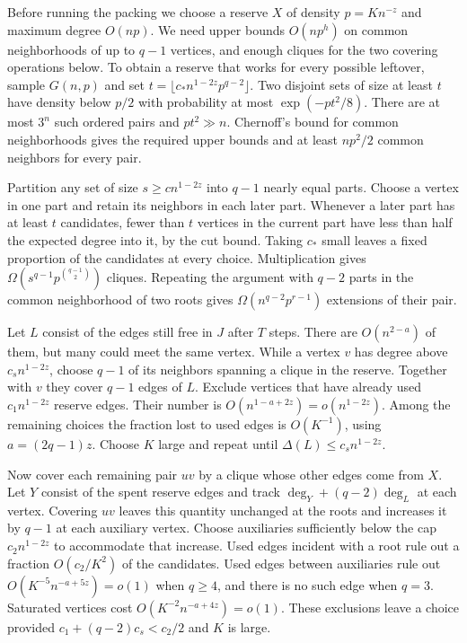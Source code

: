 \documentclass[english,11pt,a4paper]{article}
\begin{document}
Before running the packing we choose a reserve \(X\) of density \(p=Kn^{-z}\) and maximum degree \(O(np)\). We need upper bounds \(O(np^h)\) on common neighborhoods of up to \(q-1\) vertices, and enough cliques for the two covering operations below. To obtain a reserve that works for every possible leftover, sample \(G(n,p)\) and set \(t=\lfloor c_* n^{1-2z}p^{q-2}\rfloor\). Two disjoint sets of size at least \(t\) have density below \(p/2\) with probability at most \(\exp(-pt^2/8)\). There are at most \(3^n\) such ordered pairs and \(pt^2\gg n\). Chernoff's bound for common neighborhoods gives the required upper bounds and at least \(np^2/2\) common neighbors for every pair.

Partition any set of size \(s\ge c n^{1-2z}\) into \(q-1\) nearly equal parts. Choose a vertex in one part and retain its neighbors in each later part. Whenever a later part has at least \(t\) candidates, fewer than \(t\) vertices in the current part have less than half the expected degree into it, by the cut bound. Taking \(c_*\) small leaves a fixed proportion of the candidates at every choice. Multiplication gives \(\Omega(s^{q-1}p^{\binom{q-1}2})\) cliques. Repeating the argument with \(q-2\) parts in the common neighborhood of two roots gives \(\Omega(n^{q-2}p^{r-1})\) extensions of their pair.

Let \(L\) consist of the edges still free in \(J\) after \(T\) steps. There are \(O(n^{2-a})\) of them, but many could meet the same vertex. While a vertex \(v\) has degree above \(c_s n^{1-2z}\), choose \(q-1\) of its neighbors spanning a clique in the reserve. Together with \(v\) they cover \(q-1\) edges of \(L\). Exclude vertices that have already used \(c_1 n^{1-2z}\) reserve edges. Their number is \(O(n^{1-a+2z})=o(n^{1-2z})\). Among the remaining choices the fraction lost to used edges is \(O(K^{-1})\), using \(a=(2q-1)z\). Choose \(K\) large and repeat until \(\Delta(L)\le c_s n^{1-2z}\).

Now cover each remaining pair \(uv\) by a clique whose other edges come from \(X\). Let \(Y\) consist of the spent reserve edges and track \(\deg_Y+(q-2)\deg_L\) at each vertex. Covering \(uv\) leaves this quantity unchanged at the roots and increases it by \(q-1\) at each auxiliary vertex. Choose auxiliaries sufficiently below the cap \(c_2 n^{1-2z}\) to accommodate that increase. Used edges incident with a root rule out a fraction \(O(c_2/K^2)\) of the candidates. Used edges between auxiliaries rule out \(O(K^{-5}n^{-a+5z})=o(1)\) when \(q\ge4\), and there is no such edge when \(q=3\). Saturated vertices cost \(O(K^{-2}n^{-a+4z})=o(1)\). These exclusions leave a choice provided \(c_1+(q-2)c_s<c_2/2\) and \(K\) is large.
\end{document}
